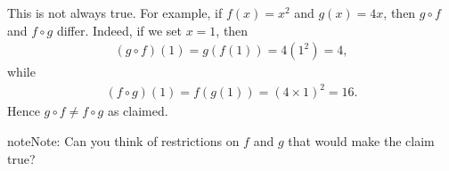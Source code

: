 \documentclass[letterpaper,10pt,english]{jupyterBook}
\begin{document}
\sphinxAtStartPar
{}

\sphinxAtStartPar
This is not always true. For example, if \(f(x) = x^2\) and
\(g(x) = 4x\), then \(g \circ f\) and \(f \circ g\) differ. Indeed, if we set
\(x=1\), then
\begin{equation*}
\begin{split}
(g \circ f)(1) = g(f(1)) = 4(1^2) = 4,
\end{split}
\end{equation*}
\sphinxAtStartPar
while
\begin{equation*}
\begin{split}
(f \circ g)(1) = f(g(1)) = (4 \times 1)^2 = 16.
\end{split}
\end{equation*}
\sphinxAtStartPar
Hence \(g \circ f \not= f \circ g\) as claimed.

\begin{sphinxadmonition}{note}{Note:}
\sphinxAtStartPar
Can you think of restrictions on \(f\) and \(g\) that would make the claim true?
\end{sphinxadmonition}
\end{document}
